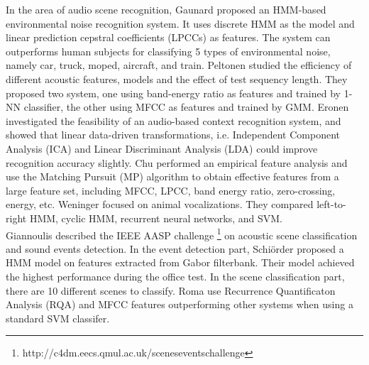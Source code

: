 In the area of audio scene recognition, Gaunard \et \parencite{} proposed an HMM-based environmental noise recognition system. 
It uses discrete HMM as the model and linear prediction cepstral coefficients (LPCCs) as features. 
The system can outperforms human subjects for classifying 5 types of environmental noise, namely car, truck, moped, aircraft, and train. 
Peltonen \et \parencite{} studied the efficiency of different acoustic features, models and the effect of test sequency length. 
They proposed two system, one using band-energy ratio as features and trained by 1-NN classifier, the other using MFCC as features and trained by GMM. 
Eronen \et \parencite{} investigated the feasibility of an audio-based context recognition system, and showed that linear data-driven transformations, i.e. Independent   Component Analysis (ICA) and Linear Discriminant Analysis (LDA) could improve recognition accuracy slightly. 
Chu \et \parencite{} performed an empirical feature analysis and use the Matching Pursuit (MP) algorithm to obtain effective features from a large feature set, including MFCC, LPCC, band energy ratio, zero-crossing, energy, etc. 
Weninger \et \parencite{} focused on animal vocalizations. They compared left-to-right HMM, cyclic HMM, recurrent neural networks, and SVM. \\

Giannoulis \et {} described the IEEE AASP challenge \footnote{http://c4dm.eecs.qmul.ac.uk/sceneseventschallenge} on acoustic scene classification and sound events detection.  
In the event detection part, Schi\"{o}rder \et proposed a HMM model on features extracted from Gabor filterbank. Their model achieved the highest performance during the office test.   
In the scene classification part, there are 10 different scenes to classify. 
Roma \et use Recurrence Quantificaton Analysis (RQA) and MFCC features outperforming other systems when using a standard SVM classifer. 

